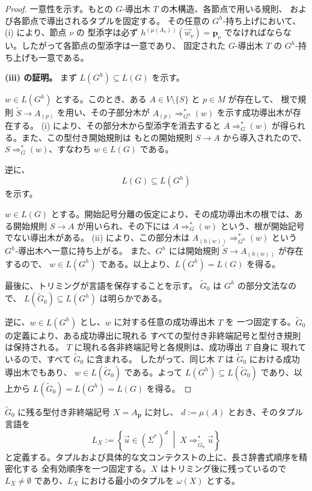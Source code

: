 \documentclass[11pt,a4paper]{ltjsarticle}
\theoremstyle{remark}
\newcommand{\tuple}[1]{\vec{#1}}
\begin{document}
\begin{proof}
一意性を示す。もとの \(G\)-導出木 \(T\) の木構造、各節点で用いる規則、
および各節点で導出されるタプルを固定する。
その任意の \(G^h\)-持ち上げにおいて、(i) により、節点 \(\nu\) の
型添字は必ず \(h^{(\mu(A_\nu))}(\tuple w_\nu)=\mathbf p_\nu\) でなければならない。したがって各節点の型添字は一意であり、
固定された \(G\)-導出木 \(T\) の \(G^h\)-持ち上げも一意である。

\medskip
\noindent
\textbf{(iii) の証明。}
まず \(L(G^h)\subseteq L(G)\) を示す。

\(w\in L(G^h)\) とする。このとき、ある \(A\in V\setminus\{S\}\) と \(p\in M\) が存在して、
根で規則 \(\widetilde S\to A_{(p)}\) を用い、その子部分木が
\(A_{(p)}\Rightarrow_{G^h}^*(w)\) を示す成功導出木が存在する。
(i) により、その部分木から型添字を消去すると
\(A\Rightarrow_G^*(w)\) が得られる。また、この型付き開始規則は
もとの開始規則 \(S\to A\) から導入されたので、
\(S\Rightarrow_G^*(w)\)、すなわち \(w\in L(G)\) である。

逆に、
\[
  L(G)\subseteq L(G^h)
\]
を示す。

\(w\in L(G)\) とする。開始記号分離の仮定により、その成功導出木の根では、ある開始規則
\(S\to A\) が用いられ、その下には
\(A\Rightarrow_G^*(w)\) という、根が開始記号でない導出木がある。
(ii) により、この部分木は
\(A_{(h(w))}\Rightarrow_{G^h}^*(w)\) という \(G^h\)-導出木へ一意に持ち上がる。
また、\(G^h\) には開始規則 \(\widetilde S\to A_{(h(w))}\) が存在するので、
\(w\in L(G^h)\) である。以上より、\(L(G^h)=L(G)\) を得る。

最後に、トリミングが言語を保存することを示す。
\(\widetilde G_0\) は \(G^h\) の部分文法なので、
\(L(\widetilde G_0)\subseteq L(G^h)\) は明らかである。

逆に、\(w\in L(G^h)\) とし、\(w\) に対する任意の成功導出木 \(T\) を
一つ固定する。\(\widetilde G_0\) の定義により、ある成功導出に現れる
すべての型付き非終端記号と型付き規則は保持される。
\(T\) に現れる各非終端記号と各規則は、成功導出 \(T\) 自身に
現れているので、すべて \(\widetilde G_0\) に含まれる。
したがって、同じ木 \(T\) は \(\widetilde G_0\) における成功導出木でもあり、
\(w\in L(\widetilde G_0)\) である。よって
\(L(G^h)\subseteq L(\widetilde G_0)\) であり、以上から
\(L(\widetilde G_0)=L(G^h)=L(G)\) を得る。
\end{proof}

\(\widetilde G_0\) に残る型付き非終端記号 \(X=A_{\mathbf p}\) に対し、
\(d:=\mu(A)\) とおき、そのタプル言語を
\[
  L_X
  :=
  \left\{
    \tuple u\in(\Sigma^*)^d
    \;\middle|\;
    X\Rightarrow_{\widetilde G_0}^*\tuple u
  \right\}
\]
と定義する。タプルおよび具体的な文コンテクストの上に、長さ辞書式順序を精密化する
全有効順序を一つ固定する。\(X\) はトリミング後に残っているので
\(L_X\ne\emptyset\) であり、\(L_X\) における最小のタプルを \(\omega(X)\) とする。
\end{document}
